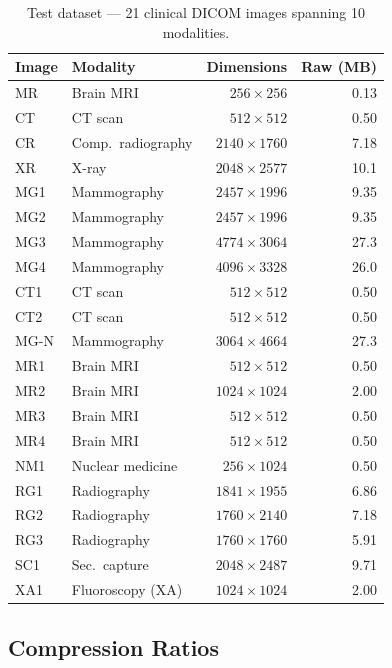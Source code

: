 \documentclass[10pt,twocolumn]{article}
\begin{document}
\begin{table}[htbp]
\centering
\footnotesize
\setlength{\tabcolsep}{4pt}
\caption{Test dataset --- 21 clinical DICOM images spanning 10 modalities.}
\label{tab:dataset}
\begin{tabular}{llrr}
\toprule
Image & Modality & Dimensions & Raw (MB) \\
\midrule
MR   & Brain MRI & $256{\times}256$ & 0.13 \\
CT   & CT scan   & $512{\times}512$ & 0.50 \\
CR   & Comp.\ radiography & $2140{\times}1760$ & 7.18 \\
XR   & X-ray & $2048{\times}2577$ & 10.1 \\
MG1  & Mammography & $2457{\times}1996$ & 9.35 \\
MG2  & Mammography & $2457{\times}1996$ & 9.35 \\
MG3  & Mammography & $4774{\times}3064$ & 27.3 \\
MG4  & Mammography & $4096{\times}3328$ & 26.0 \\
CT1  & CT scan & $512{\times}512$ & 0.50 \\
CT2  & CT scan & $512{\times}512$ & 0.50 \\
MG-N & Mammography & $3064{\times}4664$ & 27.3 \\
MR1  & Brain MRI & $512{\times}512$ & 0.50 \\
MR2  & Brain MRI & $1024{\times}1024$ & 2.00 \\
MR3  & Brain MRI & $512{\times}512$ & 0.50 \\
MR4  & Brain MRI & $512{\times}512$ & 0.50 \\
NM1  & Nuclear medicine & $256{\times}1024$ & 0.50 \\
RG1  & Radiography & $1841{\times}1955$ & 6.86 \\
RG2  & Radiography & $1760{\times}2140$ & 7.18 \\
RG3  & Radiography & $1760{\times}1760$ & 5.91 \\
SC1  & Sec.~capture     & $2048{\times}2487$ & 9.71 \\
XA1  & Fluoroscopy (XA) & $1024{\times}1024$ & 2.00 \\
\bottomrule
\end{tabular}
\end{table}

\subsection{Compression Ratios}
\end{document}
